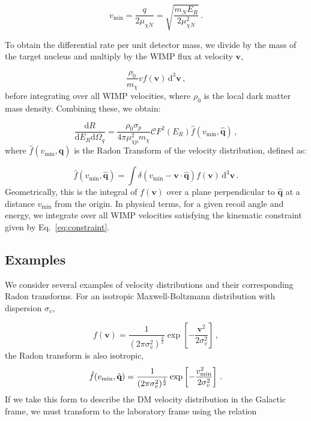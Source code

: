 \begin{equation}
v_\textrm{min} = \frac{q}{2\mu_{\chi N}} = \sqrt{\frac{m_N E_R}{2\mu_{\chi N}^2}}\,.
\end{equation}

To obtain the differential rate per unit detector mass, we divide by the mass of the target nucleus and multiply by the WIMP flux at velocity \(\textbf{v}\),

\begin{equation}
\frac{\rho_0}{m_\chi} v f(\textbf{v}) \, \textrm{d}^3 \textbf{v}\,,
\end{equation}
before integrating over all WIMP velocities, where \(\rho_0\) is the local dark matter mass density. Combining these, we obtain:

\begin{equation}
\frac{\textrm{d}R}{\textrm{d}E_R \textrm{d}\Omega_q} = \frac{\rho_0 \sigma_p}{4\pi \mu_{\chi p}^2 m_\chi} \mathcal{C} F^2(E_R) \hat{f}\left(v_\textrm{min},\hat{\textbf{q}}\right)\,,
\end{equation}
where \(\hat{f}\left(v_\textrm{min},\hat{\textbf{q}}\right)\) is the Radon Transform of the velocity distribution, defined as:

\begin{equation}
\hat{f}\left(v_\textrm{min},\hat{\textbf{q}}\right) = \int \delta\left(v_\textrm{min} - \textbf{v}\cdot\hat{\textbf{q}}\right) f(\textbf{v}) \,\textrm{d}^3\textbf{v}\,.
\end{equation}
Geometrically, this is the integral of \(f(\textbf{v})\) over a plane perpendicular to \(\hat{\textbf{q}}\) at a distance \(v_\textrm{min}\) from the origin. In physical terms, for a given recoil angle and energy, we integrate over all WIMP velocities satisfying the kinematic constraint given by Eq.\ \ref{eq:constraint}.

\subsection{Examples}

We consider several examples of velocity distributions and their corresponding Radon transforms. For an isotropic Maxwell-Boltzmann distribution with dispersion $\sigma_v$,

\begin{equation}
f(\textbf{v}) = \frac{1}{(2\pi \sigma_v^2)^{\frac{3}{2}}} \exp \left[ -\frac{\textbf{v}^2}{2 \sigma_v^2}\right]\,,
\end{equation}
the Radon transform is also isotropic,
\begin{equation}
\hat{f}(\vmin,\hat{\textbf{q}}) = \frac{1}{(2\pi \sigma_v^2)^{\frac{1}{2}}} \exp \left[ -\frac{\vmin^2}{2 \sigma_v^2}\right]\,.
\end{equation}
If we take this form to describe the DM velocity distribution in the Galactic frame, we must transform to the laboratory frame using the relation \cite{Gondolo:2002}

